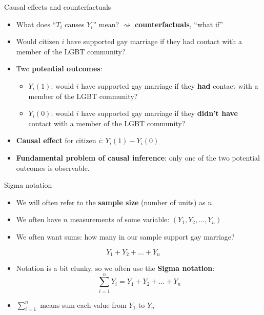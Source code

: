 \documentclass[
  ignorenonframetext,
]{beamer}
\providecommand{\tightlist}{%
  \setlength{\itemsep}{0pt}\setlength{\parskip}{0pt}}
\begin{document}
\begin{frame}{Causal effects and counterfactuals}
\label{causal-effects-and-counterfactuals-1}
\begin{itemize}
\tightlist
\item
  What does ``\(T_i\) causes \(Y_i\)'' mean? \(\rightsquigarrow\)
  \textbf{counterfactuals}, ``what if'' \pause
\item
  Would citizen \(i\) have supported gay marriage if they had contact
  with a member of the LGBT community? \pause
\item
  Two \textbf{potential outcomes}: \pause

  \begin{itemize}
  \tightlist
  \item
    \(Y_i(1)\): would \(i\) have supported gay marriage if they
    \textbf{had} contact with a member of the LGBT community? \pause
  \item
    \(Y_i(0)\): would \(i\) have supported gay marriage if they
    \textbf{didn't have} contact with a member of the LGBT community?
    \pause
  \end{itemize}
\item
  \textbf{Causal effect} for citizen \(i\): \(Y_i(1) - Y_i(0)\) \pause
\item
  \textbf{Fundamental problem of causal inference}: only one of the two
  potential outcomes is observable.
\end{itemize}
\end{frame}

\begin{frame}{Sigma notation}
\label{sigma-notation}
\begin{itemize}
\tightlist
\item
  We will often refer to the \textbf{sample size} (number of units) as
  \(n\). \pause
\item
  We often have \(n\) measurements of some variable:
  \((Y_1,Y_2,...,Y_n)\) \pause
\item
  We often want sums: how many in our sample support gay marriage?
  \pause
\end{itemize}

\[
  Y_1 + Y_2 + ... + Y_n 
  \]

\begin{itemize}
\tightlist
\item
  Notation is a bit clunky, so we often use the \textbf{Sigma notation}:
  \pause \[
    \sum_{i=1}^n Y_i = Y_1 + Y_2 + ... + Y_n
    \] \pause
\item
  \(\sum_{i=1}^n\) means sum each value from \(Y_1\) to \(Y_n\)
\end{itemize}
\end{frame}
\end{document}
